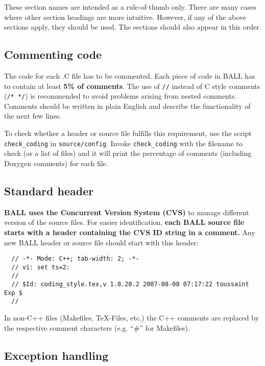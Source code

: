 \documentclass[a4paper,10pt]{article}
\begin{document}
These section names are intended as a rule-of-thumb only. There are many cases
where other section headings are more intuitive. However, if any of the above
sections apply, they should be used. The sections should also appear in this
order.

\subsection{Commenting code}

The code for each .C file has to be commented. Each piece of code in BALL has
to contain at least {\bf 5\% of comments}. The use of {\tt //} instead of C style
comments ({\tt /* */}) is recommended to avoid problems arising from nested
comments. Comments should be written in plain English and describe the
functionality of the next few lines.

To check whether a header or source file fulfills this requirement, use the
script {\tt check\_coding} in {\tt source/config}. Invoke {\tt check\_coding} with the
filename to check (or a list of files) and it will print the percentage of
comments (including Doxygen comments) for each file.

\subsection{Standard header}
                                                                                                                                                             
{\bf BALL uses the Concurrent Version System (CVS)} to manage different
version of the
source files. For easier identification, {\bf each BALL source file starts
with a header containing the CVS ID string in a comment.} Any new BALL header
or source file should start with this header:
\begin{verbatim}
  // -*- Mode: C++; tab-width: 2; -*-
  // vi: set ts=2:
  //
  // $Id: coding_style.tex,v 1.8.20.2 2007-08-08 07:17:22 toussaint Exp $
  //                                                                                                                                                             
\end{verbatim}
In non-C++ files (Makefiles, TeX-Files, etc.) the C++ comments are replaced
by the respective comment characters (e.g. ``\#'' for Makefiles).

\subsection{Exception handling}
\end{document}

